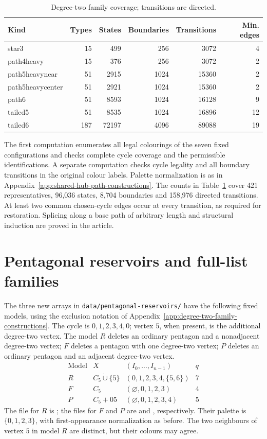 \begin{table}[htbp]
\centering\small
\caption{Degree-two family coverage; transitions are directed.}
\label{tab:degree-two-family-counts}
\begin{tabular}{lrrrrr}
\toprule
Kind & Types & States & Boundaries & Transitions & Min. edges\\
\midrule
star3&15&499&256&3072&4\\
path4heavy&15&376&256&3072&2\\
path5heavynear&51&2915&1024&15360&2\\
path5heavycenter&51&2921&1024&15360&2\\
path6&51&8593&1024&16128&9\\
tailed5&51&8535&1024&16896&12\\
tailed6&187&72197&4096&89088&19\\
\bottomrule
\end{tabular}
\end{table}

The first computation enumerates all legal colourings of the seven
fixed configurations and checks complete cycle coverage and the
permissible identifications. A separate computation checks cycle
legality and all boundary transitions in the original colour labels.
Palette normalization is as in
Appendix~\ref{app:shared-hub-path-constructions}. The counts in
Table~\ref{tab:degree-two-family-counts} cover 421 representatives,
96,036 states, 8,704 boundaries and 158,976 directed transitions.
At least two common chosen-cycle edges occur at every transition,
as required for restoration. Splicing along a base path of arbitrary
length and structural induction are proved in the article.

\clearpage
\section{Pentagonal reservoirs and full-list families}
\label{app:pentagonal-reservoir-constructions}
The three new arrays in \texttt{data/pentagonal-reservoirs/} have the
following fixed models, using the exclusion notation of
Appendix~\ref{app:degree-two-family-constructions}. The cycle is
$0,1,2,3,4,0$; vertex $5$, when present, is the additional degree-two
vertex. The model $R$ deletes an ordinary pentagon and a nonadjacent
degree-two vertex; $F$ deletes a pentagon with one degree-two vertex;
$P$ deletes an ordinary pentagon and an adjacent degree-two vertex.
\[
\begin{array}{cclc}
\text{Model}&X&(I_0,\ldots,I_{n-1})&q\\ \hline
R&C_5\mathbin{\dot\cup}\{5\}&(0,1,2,3,4,\{5,6\})&7\\
F&C_5&(\varnothing,0,1,2,3)&4\\
P&C_5+05&(\varnothing,0,1,2,3,4)&5
\end{array}
\]
The file for $R$ is ; the files for $F$
and $P$ are  and
, respectively. Their palette is $\{0,1,2,3\}$,
with first-appearance normalization as before. The two neighbours of
vertex $5$ in model $R$ are distinct, but their colours may agree.

